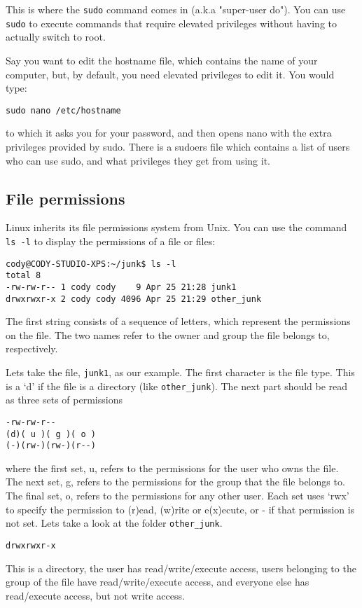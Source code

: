 \documentclass{article}
\begin{document}
This is where the \texttt{sudo} command comes in (a.k.a "super-user do"). You can use \texttt{sudo} to execute commands that require elevated privileges without having to actually switch to root.

Say you want to edit the hostname file, which contains the name of your computer, but, by default, you need elevated privileges to edit it. You would type:
\begin{verbatim}
sudo nano /etc/hostname
\end{verbatim}
to which it asks you for your password, and then opens nano with the extra privileges provided by sudo. There is a sudoers file which contains a list of users who can use sudo, and what privileges they get from using it.

\subsection{File permissions}
Linux inherits its file permissions system from Unix. You can use the command \texttt{ls -l} to display the permissions of a file or files:
\begin{verbatim}
cody@CODY-STUDIO-XPS:~/junk$ ls -l
total 8
-rw-rw-r-- 1 cody cody    9 Apr 25 21:28 junk1
drwxrwxr-x 2 cody cody 4096 Apr 25 21:29 other_junk
\end{verbatim}
The first string consists of a sequence of letters, which represent the permissions on the file. The two names refer to the owner and group the file belongs to, respectively.

Lets take the file, \texttt{junk1}, as our example.
The first character is the file type. This is a `d' if the file is a directory (like \texttt{other_junk}).
The next part should be read as three sets of permissions
\begin{verbatim}
-rw-rw-r--
(d)( u )( g )( o ) 
(-)(rw-)(rw-)(r--)
\end{verbatim} 
where the first set, u, refers to the permissions for the user who owns the file.
The next set, g, refers to the permissions for the group that the file belongs to.
The final set, o, refers to the permissions for any other user. 
Each set uses `rwx' to specify the permission to (r)ead, (w)rite or e(x)ecute, or - if that permission is not set.
Lets take a look at the folder \texttt{other_junk}.
\begin{verbatim}
drwxrwxr-x
\end{verbatim}
This is a directory, the user has read/write/execute access, users belonging to the group of the file have read/write/execute access, and everyone else has read/execute access, but not write access.
\end{document}
